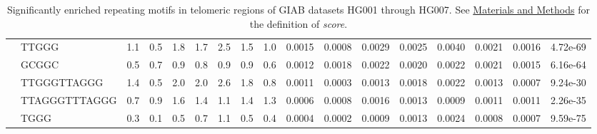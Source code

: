 \begin{landscape}
\begin{samepage}
\begin{table}[h!]
\begin{tabular}{lllllllllllllllll}
\textbf{}    & TTGGG          & 1.1            & 0.5            & 1.8            & 1.7            & 2.5            & 1.5            & 1.0            & 0.0015         & 0.0008         & 0.0029         & 0.0025         & 0.0040         & 0.0021         & 0.0016         & 4.72e-69                   \\
\textbf{}    & GCGGC          & 0.5            & 0.7            & 0.9            & 0.8            & 0.9            & 0.9            & 0.6            & 0.0012         & 0.0018         & 0.0022         & 0.0020         & 0.0022         & 0.0021         & 0.0015         & 6.16e-64                   \\
\textbf{}    & TTGGGTTAGGG    & 1.4            & 0.5            & 2.0            & 2.0            & 2.6            & 1.8            & 0.8            & 0.0011         & 0.0003         & 0.0013         & 0.0018         & 0.0022         & 0.0013         & 0.0007         & 9.24e-30                   \\
\textbf{}    & TTAGGGTTTAGGG  & 0.7            & 0.9            & 1.6            & 1.4            & 1.1            & 1.4            & 1.3            & 0.0006         & 0.0008         & 0.0016         & 0.0013         & 0.0009         & 0.0011         & 0.0011         & 2.26e-35                   \\
\textbf{}    & TGGG           & 0.3            & 0.1            & 0.5            & 0.7            & 1.1            & 0.5            & 0.4            & 0.0004         & 0.0002         & 0.0009         & 0.0013         & 0.0024         & 0.0008         & 0.0007         & 9.59e-75                   \\
\hline
\end{tabular}
\caption{
    \small Significantly enriched repeating motifs in telomeric regions of GIAB datasets HG001 through HG007.
    See \hyperref[sec:methods]{Materials and Methods} for the definition of \textit{score}.
}
\label{tab:repeatfinder}
\end{table}
\end{samepage}
\end{landscape}
